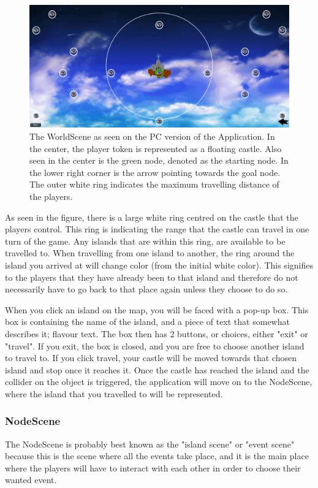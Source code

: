 \begin{figure}[!ht]
    \centering
    \includegraphics[scale=0.3]{Images/WorldScene.png}
    \caption{The WorldScene as seen on the PC version of the Application. In the center, the player token is represented as a floating castle. Also seen in the center is the green node, denoted as the starting node. In the lower right corner is the arrow pointing towards the goal node. The outer white ring indicates the maximum travelling distance of the players.}
    \label{fig:worldSc}
\end{figure}

As seen in the figure, there is a large white ring centred on the castle that the players control. This ring is indicating the range that the castle can travel in one turn of the game. Any islands that are within this ring, are available to be travelled to.
When travelling from one island to another, the ring around the island you arrived at will change color (from the initial white color). This signifies to the players that they have already been to that island and therefore do not necessarily have to go back to that place again unless they choose to do so.

When you click an island on the map, you will be faced with a pop-up box. This box is containing the name of the island, and a piece of text that somewhat describes it; flavour text. The box then has 2 buttons, or choices, either "exit" or "travel". If you exit, the box is closed, and you are free to choose another island to travel to. If you click travel, your castle will be moved towards that chosen island and stop once it reaches it. 
Once the castle has reached the island and the collider on the object is triggered, the application will move on to the NodeScene, where the island that you travelled to will be represented.

\subsubsection{NodeScene}
\label{sec:nodeScene}
The NodeScene is probably best known as the "island scene" or "event scene" because this is the scene where all the events take place, and it is the main place where the players will have to interact with each other in order to choose their wanted event.

